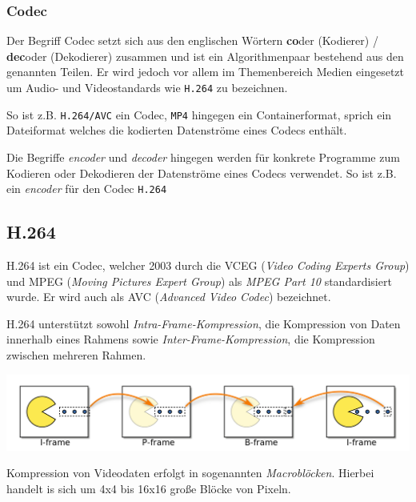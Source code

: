 \subsubsection{Codec}
Der Begriff Codec setzt sich aus den englischen W\"ortern \textbf{co}der (Kodierer) / \textbf{dec}oder (Dekodierer)
zusammen\cite{codec} und ist ein Algorithmenpaar bestehend aus den genannten Teilen.
Er wird jedoch vor allem im Themenbereich Medien eingesetzt um Audio- und Videostandards wie \texttt{H.264} zu
bezeichnen.

\noindent\newline So ist z.B. \texttt{H.264/AVC} ein Codec, \texttt{MP4} hingegen ein Containerformat, sprich ein Dateiformat welches
die kodierten Datenstr\"ome eines Codecs enth\"alt.

\noindent\newline Die Begriffe \textit{encoder} und \textit{decoder} hingegen werden f\"ur konkrete Programme zum
Kodieren oder Dekodieren der Datenstr\"ome eines Codecs verwendet.
So ist z.B. \cite{x264} ein \textit{encoder} f\"ur den Codec \texttt{H.264}

\subsection{H.264}\label{subsec:h.264}
H.264 ist ein Codec, welcher 2003\cite{h264} durch die VCEG (\textit{Video Coding Experts Group}) und MPEG
(\textit{Moving Pictures Expert Group}) als \textit{MPEG Part 10} standardisiert wurde.
Er wird auch als AVC (\textit{Advanced Video Codec}) bezeichnet.

\noindent\newline H.264 unterst\"utzt sowohl \textit{Intra-Frame-Kompression}, die Kompression von Daten innerhalb eines Rahmens sowie
\textit{Inter-Frame-Kompression}, die Kompression zwischen mehreren Rahmen.

\noindent\newline\includegraphics[width=\textwidth]{../img/frames}

\noindent\newline Kompression von Videodaten erfolgt in sogenannten \textit{Macrobl\"ocken}.
Hierbei handelt is sich um 4x4 bis 16x16 gro{\ss}e Bl\"ocke von Pixeln.

